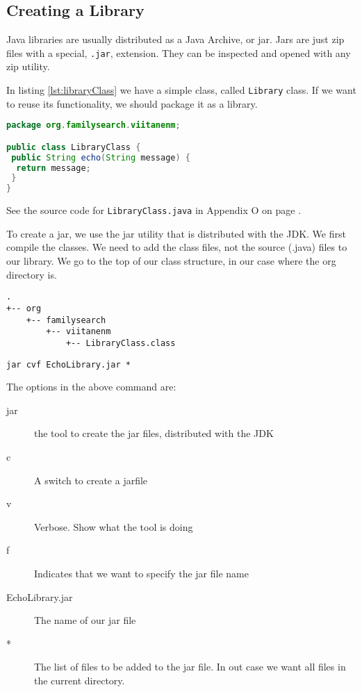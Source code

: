 \subsection{Creating a Library}

Java libraries are usually distributed as a Java Archive, or jar. Jars are just zip files with a special, \texttt{.jar}, extension. They can be inspected and opened with any zip utility.

In listing \ref{lst:libraryClass} we have a simple class, called \texttt{Library} class. If we want to reuse its functionality, we should package it as a library. 
\begin{lstlisting}[language=Java, label=lst:libraryClass, caption=Library Class]
package org.familysearch.viitanenm;

public class LibraryClass {
 public String echo(String message) {
  return message;
 }
}
\end{lstlisting}
\vspace{2em}

See the source code for \texttt{LibraryClass.java} in Appendix O on page \pageref{App:AppendixO}.

To create a jar, we use the jar utility that is distributed with the JDK. We first compile the classes. We need to add the class files, not the source (.java) files to our library. We go to the top of our class structure, in our case where the org directory is.

\begin{lstlisting}
.
+-- org
    +-- familysearch
        +-- viitanenm
            +-- LibraryClass.class
\end{lstlisting}


\begin{lstlisting}
jar cvf EchoLibrary.jar *
\end{lstlisting}
The options in the above command are:
\begin{description}
\item[jar] the tool to create the jar files, distributed with the JDK
\item[c] A switch to create a jarfile
\item[v] Verbose. Show what the tool is doing
\item[f] Indicates that we want to specify the jar file name
\item[EchoLibrary.jar] The name of our jar file
\item[*] The list of files to be added to the jar file. In out case we want all files in the current directory.
\end{description}

